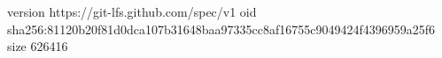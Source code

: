 version https://git-lfs.github.com/spec/v1
oid sha256:81120b20f81d0dca107b31648baa97335cc8af16755c9049424f4396959a25f6
size 626416
